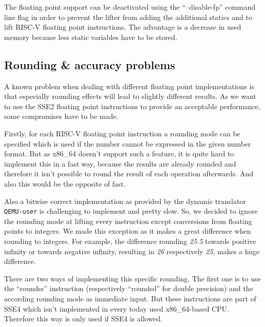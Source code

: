 \documentclass[course=eragp]{aspdoc}
\begin{document}
\par

The floating point support can be deactivated using the ``--disable-fp'' command line flag in order
to prevent the lifter from adding the additional statics and to lift RISC-V floating point
instructions. The advantage is a decrease in used memory because less static variables have to be
stored.

\par

\subsection{Rounding \& accuracy problems}

A known problem when dealing with different floating point implementations is that especially
rounding effects will lead to slightly different results. As we want to use the SSE2 floating point
instructions to provide an acceptable performance, some compromises have to be made.

\par

Firstly, for each RISC-V floating point instruction a rounding mode can be specified which is used
if the number cannot be expressed in the given number format. But as x86\_64 doesn't support such a
feature, it is quite hard to implement this in a fast way, because the results are already rounded
and therefore it isn't possible to round the result of each operation afterwards. And also this
would be the opposite of fast.

\par

Also a bitwise correct implementation as provided by the dynamic translator \texttt{QEMU-user} is
challenging to implement and pretty slow. So, we decided to ignore the rounding mode at lifting
every instruction except conversions from floating points to integers. We made this exception as it
makes a great difference when rounding to integers. For example, the difference rounding \emph{25.5}
towards positive infinity or towards negative infinity, resulting in \emph{26} respectively
\emph{25}, makes a huge difference.

\par

There are two ways of implementing this specific rounding. The first one is to use the ``roundss''
instruction (respectively ``roundsd'' for double precision) and the according rounding mode as
immediate input. But these instructions are part of SSE4 which isn't implemented in every today used
x86\_64-based CPU.~\cite{intel2017man} Therefore this way is only used if SSE4 is allowed.
\end{document}
